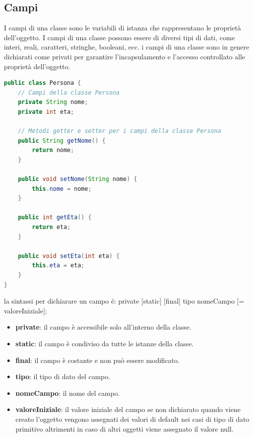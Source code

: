 \documentclass[11pt]{article}
\begin{document}
\subsection{Campi}
I campi di una classe sono le variabili di istanza che rappresentano le proprietà dell'oggetto.
I campi di una classe possono essere di diversi tipi di dati, come interi, reali, caratteri, stringhe, booleani, ecc.
i campi di una classe sono in genere dichiarati come privati per garantire l'incapsulamento e l'accesso controllato alle proprietà dell'oggetto.
\begin{lstlisting}[language=Java]
public class Persona {
    // Campi della classe Persona
    private String nome;
    private int eta;

    // Metodi getter e setter per i campi della classe Persona
    public String getNome() {
        return nome;
    }

    public void setNome(String nome) {
        this.nome = nome;
    }

    public int getEta() {
        return eta;
    }

    public void setEta(int eta) {
        this.eta = eta;
    }
}
\end{lstlisting}
la sintassi per dichiarare un campo é:
private [static] [final] tipo nomeCampo [= valoreIniziale];
\begin{itemize}
    \item \textbf{private}: il campo è accessibile solo all'interno della classe.
    \item \textbf{static}: il campo è condiviso da tutte le istanze della classe.
    \item \textbf{final}: il campo è costante e non può essere modificato.
    \item \textbf{tipo}: il tipo di dato del campo.
    \item \textbf{nomeCampo}: il nome del campo.
    \item \textbf{valoreIniziale}: il valore iniziale del campo se non dichiarato quando viene creato l'oggetto vengono assegnati dei valori di default nei casi di tipo di dato primitivo altrimenti in caso di altri oggetti viene assegnato il valore null.
    \end{itemize}
\end{document}
